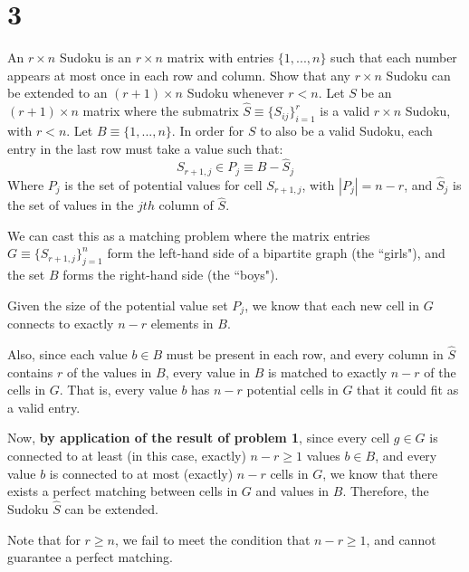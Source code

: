 \section*{3}
An $r \times n$ Sudoku is an $r \times n$ matrix with entries $\lbrace 1, . . . , n\rbrace$ such that each number appears at most once in each row and column. Show that any $r\times n$ Sudoku can be extended to an $(r+1) \times n$ Sudoku whenever $r < n$.
\probLine
Let $S$ be an $(r+1)\times n$ matrix where the submatrix $\hat{S} \equiv \lbrace S_{ij} \rbrace_{i=1}^{r}$ is a valid $r \times n$ Sudoku, with $r<n$. Let $B\equiv \lbrace 1,...,n \rbrace$. In order for $S$ to also be a valid Sudoku, each entry in the last row must take a value such that:
\[
S_{r+1,j} \in P_j \equiv B - \hat{S}_j
\]
Where $P_j$ is the set of potential values for cell $S_{r+1,j}$, with $|P_j| = n-r$, and $\hat{S}_j$ is the set of values in the $jth$ column of $\hat{S}$. 

We can cast this as a matching problem where the matrix entries $G \equiv \lbrace S_{r+1,j} \rbrace_{j=1}^{n}$ form the left-hand side of a bipartite graph (the ``girls"), and the set $B$ forms the right-hand side (the ``boys"). 

Given the size of the potential value set $P_j$, we know that each new cell in $G$ connects to exactly $n-r$ elements in $B$. 

Also, since each value $b \in B$ must be present in each row, and every column in $\hat{S}$ contains $r$ of the values in $B$, every value in $B$ is matched to exactly $n-r$ of the cells in $G$. That is, every value $b$ has $n-r$ potential cells in $G$ that it could fit as a valid entry.

Now, \textbf{by application of the result of problem 1}, since every cell $g \in G$ is connected to at least (in this case, exactly) $n-r \geq 1$ values $b \in B$, and every value $b$ is connected to at most (exactly) $n-r$ cells in $G$, we know that there exists a perfect matching between cells in $G$ and values in $B$. Therefore, the Sudoku $\hat{S}$ can be extended. 

Note that for $r \geq n$, we fail to meet the condition that $n-r \geq 1$, and cannot guarantee a perfect matching.
